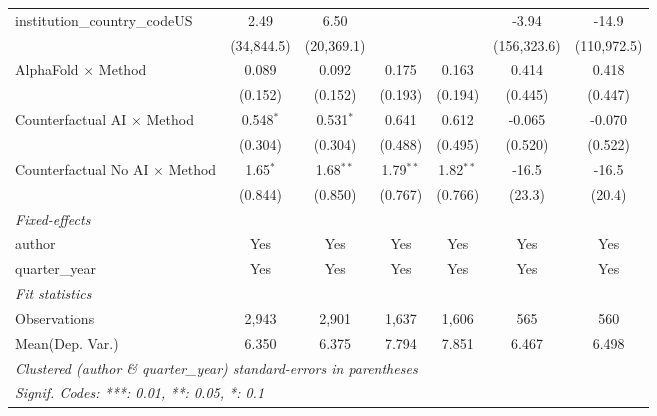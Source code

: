 \begin{tabular}{lcccccc}
   institution\_country\_codeUS          & 2.49         & 6.50         &               &               & -3.94       & -14.9\\   
                                         & (34,844.5)   & (20,369.1)   &               &               & (156,323.6) & (110,972.5)\\   
   AlphaFold $\times$ Method             & 0.089        & 0.092        & 0.175         & 0.163         & 0.414       & 0.418\\   
                                         & (0.152)      & (0.152)      & (0.193)       & (0.194)       & (0.445)     & (0.447)\\   
   Counterfactual AI $\times$ Method     & 0.548$^{*}$  & 0.531$^{*}$  & 0.641         & 0.612         & -0.065      & -0.070\\   
                                         & (0.304)      & (0.304)      & (0.488)       & (0.495)       & (0.520)     & (0.522)\\   
   Counterfactual No AI $\times$ Method  & 1.65$^{*}$   & 1.68$^{**}$  & 1.79$^{**}$   & 1.82$^{**}$   & -16.5       & -16.5\\   
                                         & (0.844)      & (0.850)      & (0.767)       & (0.766)       & (23.3)      & (20.4)\\   
   \midrule
   \emph{Fixed-effects}\\
   author                                & Yes          & Yes          & Yes           & Yes           & Yes         & Yes\\  
   quarter\_year                         & Yes          & Yes          & Yes           & Yes           & Yes         & Yes\\  
   \midrule
   \emph{Fit statistics}\\
   Observations                          & 2,943        & 2,901        & 1,637         & 1,606         & 565         & 560\\  
Mean(Dep. Var.) & 6.350 & 6.375 & 7.794 & 7.851 & 6.467 & 6.498 \\
   \midrule \midrule
   \multicolumn{7}{l}{\emph{Clustered (author \& quarter\_year) standard-errors in parentheses}}\\
   \multicolumn{7}{l}{\emph{Signif. Codes: ***: 0.01, **: 0.05, *: 0.1}}\\
\end{tabular}
\par\endgroup
